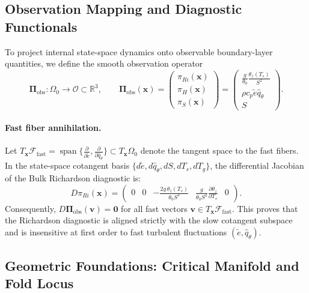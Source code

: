 \subsection{Observation Mapping and Diagnostic Functionals}

To project internal state-space dynamics onto observable boundary-layer quantities, we define the smooth observation operator
\begin{equation}
\boldsymbol{\Pi}_{\mathrm{obs}} : \Omega_0 \to \mathcal O \subset \mathbb{R}^3, \qquad
\boldsymbol{\Pi}_{\mathrm{obs}}(\mathbf{x})
= \begin{pmatrix}
\pi_{Ri}(\mathbf{x}) \\
\pi_H(\mathbf{x}) \\
\pi_S(\mathbf{x})
\end{pmatrix}
= \begin{pmatrix}
\frac{g}{\theta_0}\frac{\theta_z(T_s)}{S^2} \\[4pt]
\rho c_p \tilde e \hat q_\theta \\[2pt]
S
\end{pmatrix}.
\end{equation}

\paragraph{Fast fiber annihilation.}
Let $T_{\mathbf{x}}\mathcal{F}_{\mathrm{fast}} = \operatorname{span}\{\frac{\partial}{\partial \tilde e}, \frac{\partial}{\partial \hat q_\theta}\} \subset T_{\mathbf{x}}\Omega_0$ denote the tangent space to the fast fibers. In the state-space cotangent basis $\{d\tilde e, d\hat q_\theta, dS, dT_s, dT_g\}$, the differential Jacobian of the Bulk Richardson diagnostic is:
\begin{equation}
D\pi_{Ri}(\mathbf{x}) = \begin{pmatrix} 0 & 0 & -\frac{2g\,\theta_z(T_s)}{\theta_0 S^3} & \frac{g}{\theta_0 S^2}\frac{\partial \theta_z}{\partial T_s} & 0 \end{pmatrix}.
\end{equation}
Consequently, $D\boldsymbol{\Pi}_{\mathrm{obs}}(\mathbf{v}) = \mathbf{0}$ for all fast vectors $\mathbf{v} \in T_{\mathbf{x}}\mathcal{F}_{\mathrm{fast}}$. This proves that the Richardson diagnostic is aligned strictly with the slow cotangent subspace and is insensitive at first order to fast turbulent fluctuations $(\tilde e, \hat q_\theta)$.

\subsection{Geometric Foundations: Critical Manifold and Fold Locus}

